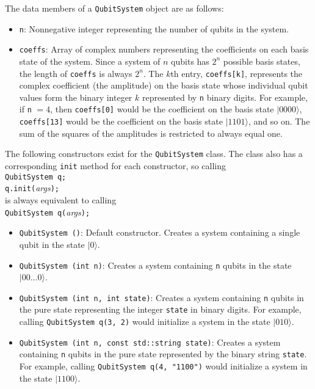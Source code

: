 \documentclass{article}
\begin{document}
The data members of a \verb~QubitSystem~ object are as follows: 
\begin{itemize}
\item \verb~n~: Nonnegative integer representing the number of qubits in the system. 
\item \verb~coeffs~: Array of complex numbers representing the coefficients on each basis state of the system. Since a system of $n$ qubits has $2^n$ possible basis states, the length of \verb~coeffs~ is always $2^n$. The $k$th entry, \verb~coeffs[k]~, represents the complex coefficient (the amplitude) on the basis state whose individual qubit values form the binary integer $k$ represented by \verb~n~ binary digits. For example, if \verb~n~ $= 4$, then \verb~coeffs[0]~ would be the coefficient on the basis state $|0000\rangle$, \verb~coeffs[13]~ would be the coefficient on the basis state $|1101\rangle$, and so on. The sum of the squares of the amplitudes is restricted to always equal one. 
\end{itemize}

The following constructors exist for the \verb~QubitSystem~ class. The class also has a corresponding \verb~init~ method for each constructor, so calling \\
\hspace*{1em} \verb~QubitSystem q;~ \\
\hspace*{1em} \verb~q.init(~\emph{args}\verb~);~ \\
is always equivalent to calling \\
\hspace*{1em} \verb~QubitSystem q(~\emph{args}\verb~);~ 
\begin{itemize}
\item \verb~QubitSystem ()~: Default constructor. Creates a system containing a single qubit in the state $|0\rangle$. 
\item \verb~QubitSystem (int n)~: Creates a system containing \verb~n~ qubits in the state $|00...0\rangle$. 
\item \verb~QubitSystem (int n, int state)~: Creates a system containing \verb~n~ qubits in the pure state representing the integer \verb~state~ in binary digits. For example, calling \verb~QubitSystem q(3, 2)~ would initialize a system in the state $|010\rangle$. 
\item \verb~QubitSystem (int n, const std::string state)~: Creates a system containing \verb~n~ qubits in the pure state represented by the binary string \verb~state~. For example, calling \verb~QubitSystem q(4, "1100")~ would initialize a system in the state $|1100\rangle$. 
\end{itemize}
\end{document}
